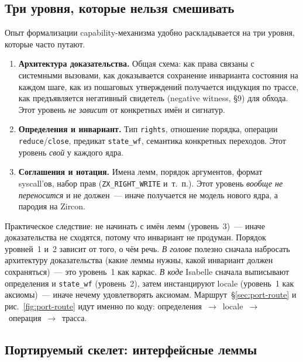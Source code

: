 \documentclass[11pt,a4paper]{article}
\begin{document}
\subsection{Три уровня, которые нельзя смешивать}
\label{sec:port-levels}

Опыт формализации \textenglish{capability}-механизма удобно раскладывается
на три уровня, которые часто путают.

\begin{enumerate}[leftmargin=1.4em]
	\item \textbf{Архитектура доказательства.}
	      Общая схема: как права связаны с системными вызовами, как
	      доказывается сохранение инварианта состояния на каждом шаге,
	      как из пошаговых утверждений получается индукция по трассе, как
	      предъявляется негативный свидетель (negative witness, §9) для
	      обхода. Этот уровень \emph{не зависит} от конкретных имён и
	      сигнатур.
	\item \textbf{Определения и инвариант.}
	      Тип \texttt{rights}, отношение порядка, операции
	      \texttt{reduce}/\texttt{close}, предикат \texttt{state\_wf},
	      семантика конкретных переходов. Этот уровень \emph{свой} у каждого
	      ядра.
	\item \textbf{Соглашения и нотация.}
	      Имена лемм, порядок аргументов, формат syscall'ов, набор прав
	      (\texttt{ZX\_RIGHT\_WRITE} и~т.~п.). Этот уровень \emph{вообще не
		      переносится} и не должен~--- иначе получается не модель нового
	      ядра, а пародия на Zircon.
\end{enumerate}

Практическое следствие: не начинать с имён лемм (уровень~3)~--- иначе
доказательства не сходятся, потому что инвариант не продуман. Порядок
уровней~1 и~2 зависит от того, о чём речь. \emph{В голове} полезно
сначала набросать архитектуру доказательства (какие леммы нужны,
какой инвариант должен сохраняться)~--- это уровень~1 как каркас.
\emph{В коде} Isabelle сначала выписывают определения и
\texttt{state\_wf} (уровень~2), затем инстанцируют locale
(уровень~1 как аксиомы)~--- иначе нечему удовлетворять аксиомам.
Маршрут~\S\ref{sec:port-route} и рис.~\ref{fig:port-route} идут именно
по коду: определения~$\to$~locale~$\to$~операция~$\to$~трасса.

\subsection{Портируемый скелет: интерфейсные леммы}
\label{sec:port-locale}
\end{document}
